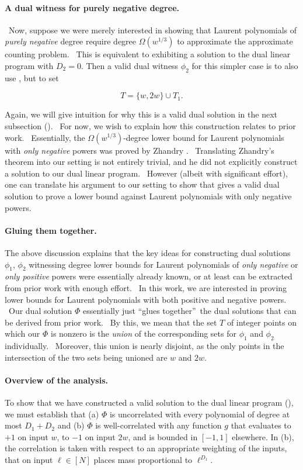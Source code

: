 \documentclass[10pt,a4paper]{article}
\newcommand{\<}{\langle}
\renewcommand{\>}{\rangle}
\newcommand{\para}[1]{\paragraph{#1}}
\begin{document}
\para{A dual witness for purely negative degree.} \
Now, suppose we were merely interested in showing that Laurent polynomials
of \emph{purely negative} degree require degree $\Omega (w^{1/3})$ to
approximate the approximate counting problem. \ This is equivalent to
exhibiting a solution to the dual linear program with $D_{2}=0$.  Then a
valid dual witness $\phi_2 $ for this simpler case is to also use 
\Cref{phidef}, but to set

\begin{equation}  \label{simplerT2}
T= \{w, 2w\} \cup T_1.
\end{equation}

Again, we will give intuition for why this is a valid dual solution in the
next subsection (\Cref{s:nextsubsection}). \ For now, we wish to explain how
this construction relates to prior work. \ Essentially, the $\Omega \left(
w^{1/3}\right) $-degree lower bound for Laurent polynomials with \emph{only
negative} powers was proved by Zhandry \cite[Theorem 7.3]{zhandry}. \
Translating Zhandry's theorem into our setting is not entirely trivial, and
he did not explicitly construct a solution to our dual linear program. \
However (albeit with significant effort), one can translate his argument to
our setting to show that \Cref{simplerT2} gives a valid dual
solution to prove a lower bound against Laurent polynomials with only
negative powers.

\para{Gluing them together.} The above discussion
explains that the key ideas for constructing dual solutions $\phi _{1}$, $
\phi _{2}$ witnessing degree lower bounds for Laurent polynomials of \emph{
only negative} or \emph{only positive} powers were essentially already
known, or at least can be extracted from prior work with enough effort. \ In this work, we are interested in proving lower bounds for Laurent
polynomials with both positive and negative powers. \ Our dual solution $
\Phi $ essentially just \textquotedblleft glues together\textquotedblright\
the dual solutions that can be derived from prior work. \ By this, we mean
that the set $T$ of integer points on which our $\Phi $ is nonzero is the
\emph{union} of the corresponding sets for $\phi _{1}$ and $\phi _{2}$
individually. \ Moreover, this union is nearly disjoint, as the only points
in the intersection of the two sets being unioned are $w$ and $2w$.

\para{Overview of the analysis.}
To show that we have constructed
a valid solution 
to the dual linear program (),
we
must establish
that (a) $\Phi$ is uncorrelated
with every polynomial of degree 
at most $D_1 + D_2$
and (b) $\Phi$ is
well-correlated  with 
any function $g$ that evaluates
to $+1$ on input $w$, to $-1$ 
on input $2w$, and is bounded in $[-1, 1]$ elsewhere.
In (b), the correlation is taken
with respect to 
an appropriate weighting
of the inputs, that on input $\ell \in [N]$ places
mass proportional to $\ell^{D_1}$.
\end{document}
